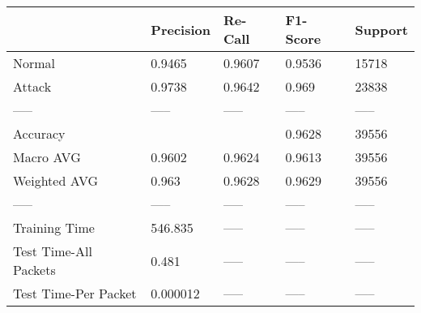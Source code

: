 \begin{tabular}{lllll}
\toprule
{} & Precision & Re-Call & F1-Score & Support \\
\midrule
Normal                &    0.9465 &  0.9607 &   0.9536 &   15718 \\
Attack                &    0.9738 &  0.9642 &    0.969 &   23838 \\
-----                 &     ----- &   ----- &    ----- &   ----- \\
Accuracy              &           &         &   0.9628 &   39556 \\
Macro AVG             &    0.9602 &  0.9624 &   0.9613 &   39556 \\
Weighted AVG          &     0.963 &  0.9628 &   0.9629 &   39556 \\
-----                 &     ----- &   ----- &    ----- &   ----- \\
Training Time         &   546.835 &   ----- &    ----- &   ----- \\
Test Time-All Packets &     0.481 &   ----- &    ----- &   ----- \\
Test Time-Per Packet  &  0.000012 &   ----- &    ----- &   ----- \\
\bottomrule
\end{tabular}
